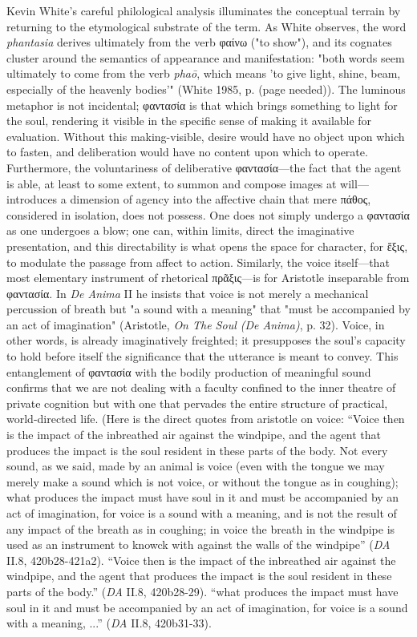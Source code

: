 \documentclass{article}
\newcommand{\gk}[1]{{\greekfont #1}}
\begin{document}
\begin{list}
    \item Kevin White's careful philological analysis illuminates the conceptual terrain by returning to the etymological substrate of the term. As White observes, the word \textit{phantasia} derives ultimately from the verb \gk{φαίνω} ("to show"), and its cognates cluster around the semantics of appearance and manifestation: "both words seem ultimately to come from the verb \textit{phaō}, which means 'to give light, shine, beam, especially of the heavenly bodies'" (White 1985, p. (page needed)). The luminous metaphor is not incidental; \gk{φαντασία} is that which brings something to light for the soul, rendering it visible in the specific sense of making it available for evaluation. Without this making-visible, desire would have no object upon which to fasten, and deliberation would have no content upon which to operate. Furthermore, the voluntariness of deliberative \gk{φαντασία}—the fact that the agent is able, at least to some extent, to summon and compose images at will—introduces a dimension of agency into the affective chain that mere \gk{πάθος}, considered in isolation, does not possess. One does not simply undergo a \gk{φαντασία} as one undergoes a blow; one can, within limits, direct the imaginative presentation, and this directability is what opens the space for character, for \gk{ἕξις}, to modulate the passage from affect to action. Similarly, the voice itself—that most elementary instrument of rhetorical \gk{πρᾶξις}—is for Aristotle inseparable from \gk{φαντασία}. In \textit{De Anima} II he insists that voice is not merely a mechanical percussion of breath but "a sound with a meaning" that "must be accompanied by an act of imagination" (Aristotle, \textit{On The Soul (De Anima)}, p. 32). Voice, in other words, is already imaginatively freighted; it presupposes the soul's capacity to hold before itself the significance that the utterance is meant to convey. This entanglement of \gk{φαντασία} with the bodily production of meaningful sound confirms that we are not dealing with a faculty confined to the inner theatre of private cognition but with one that pervades the entire structure of practical, world-directed life. (Here is the direct quotes from aristotle on voice: ``Voice then is the impact of the inbreathed air against the windpipe, and the agent that produces the impact is the soul resident in these parts of the body. Not every sound, as we said, made by an animal is voice (even with the tongue we may merely make a sound which is not voice, or without the tongue as in coughing); what produces the impact must have soul in it and must be accompanied by an act of imagination, for voice is a sound with a meaning, and is not the result of any impact of the breath as in coughing; in voice the breath in the windpipe is used as an instrument to knowck with against the walls of the windpipe'' (\textit{DA} II.8, 420b28-421a2). ``Voice then is the impact of the inbreathed air against the windpipe, and the agent that produces the impact is the soul resident in these parts of the body.'' (\textit{DA} II.8, 420b28-29). ``what produces the impact must have soul in it and must be accompanied by an act of imagination, for voice is a sound with a meaning, ...'' (\textit{DA} II.8, 420b31-33).


\end{list}
\end{document}
